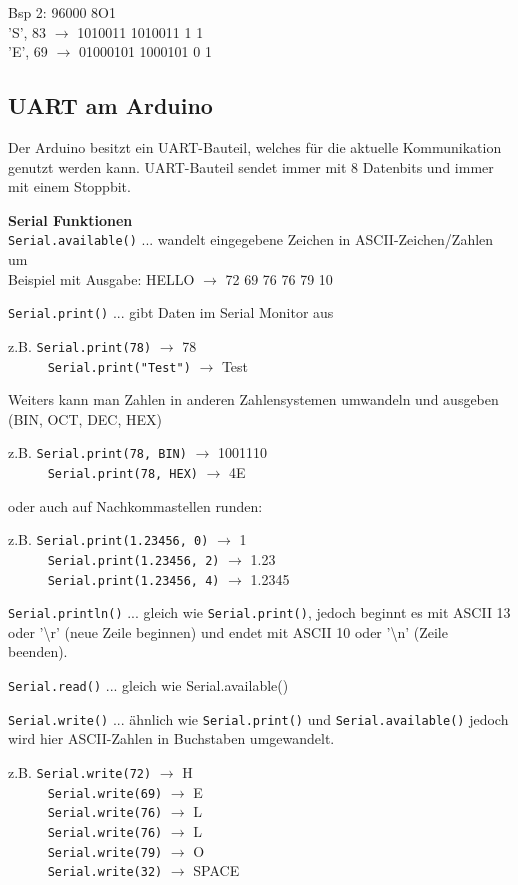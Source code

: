 Bsp 2: 96000 8O1 \\
'S', 83 $\rightarrow$ 1010011  1010011 1 1 \\
'E', 69 $\rightarrow$ 01000101  1000101 0 1

\subsection*{UART am Arduino}
Der Arduino besitzt ein UART-Bauteil, welches für die aktuelle Kommunikation genutzt werden kann. UART-Bauteil sendet immer mit 8 Datenbits und immer mit einem Stoppbit.

\textbf{Serial Funktionen} \\
\texttt{Serial.available()} ... wandelt eingegebene Zeichen in ASCII-Zeichen/Zahlen um \\
Beispiel mit Ausgabe: HELLO $\rightarrow$ 72 69 76 76 79 10

\texttt{Serial.print()} ... gibt Daten im Serial Monitor aus
\begin{tabbing}
	z.B. \= \texttt{Serial.print(78)} $\rightarrow$ 78 \\
	~~~~~ \= \texttt{Serial.print("Test")} $\rightarrow$ Test 
\end{tabbing}
Weiters kann man Zahlen in anderen Zahlensystemen umwandeln und ausgeben (BIN, OCT, DEC, HEX) 
\begin{tabbing}
	z.B. \= \texttt{Serial.print(78, BIN)} $\rightarrow$ 1001110 \\
	~~~~~ \= \texttt{Serial.print(78, HEX)} $\rightarrow$ 4E 
\end{tabbing}
oder auch auf Nachkommastellen runden:
\begin{tabbing}
	z.B. \= \texttt{Serial.print(1.23456, 0)} $\rightarrow$ 1 \\
	~~~~~ \= \texttt{Serial.print(1.23456, 2)} $\rightarrow$ 1.23 \\
	~~~~~ \= \texttt{Serial.print(1.23456, 4)} $\rightarrow$ 1.2345
\end{tabbing}

\texttt{Serial.println()} ... gleich wie \texttt{Serial.print()}, jedoch beginnt es mit ASCII 13 oder '\textbackslash r' (neue Zeile beginnen) und endet mit ASCII 10 oder '\textbackslash n' (Zeile beenden).

\texttt{Serial.read()} ... gleich wie Serial.available()

\texttt{Serial.write()} ... ähnlich wie \texttt{Serial.print()} und \texttt{Serial.available()} jedoch wird hier ASCII-Zahlen in Buchstaben umgewandelt.
\begin{tabbing}
	z.B. \= \texttt{Serial.write(72)} $\rightarrow$ H \\
	~~~~~ \= \texttt{Serial.write(69)} $\rightarrow$ E \\
	~~~~~ \= \texttt{Serial.write(76)} $\rightarrow$ L \\
	~~~~~ \= \texttt{Serial.write(76)} $\rightarrow$ L \\
	~~~~~ \= \texttt{Serial.write(79)} $\rightarrow$ O \\
	~~~~~ \= \texttt{Serial.write(32)} $\rightarrow$ SPACE
\end{tabbing}

